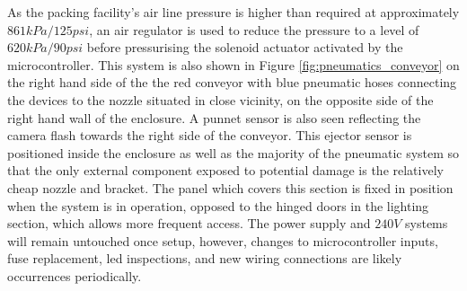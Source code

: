 \documentclass[fleqn,twoside,12pt]{report}
\begin{document}
As the packing facility's air line pressure is higher than required at approximately $861kPa/125psi$, an air regulator is used to reduce the pressure to a level of $620kPa/90psi$ before pressurising the solenoid actuator activated by the microcontroller. This system is also shown in Figure \ref{fig:pneumatics_conveyor} on the right hand side of the the red conveyor with blue pneumatic hoses connecting the devices to the nozzle situated in close vicinity, on the opposite side of the right hand wall of the enclosure. A punnet sensor is also seen reflecting the camera flash towards the right side of the conveyor. This ejector sensor is positioned inside the enclosure as well as the majority of the pneumatic system so that the only external component exposed to potential damage is the relatively cheap nozzle and bracket. The panel which covers this section is fixed in position when the system is in operation, opposed to the hinged doors in the lighting section, which allows more frequent access. The power supply and $240V$ systems will remain untouched once setup, however, changes to microcontroller inputs, fuse replacement, led inspections, and new wiring connections are likely occurrences periodically.
\end{document}
